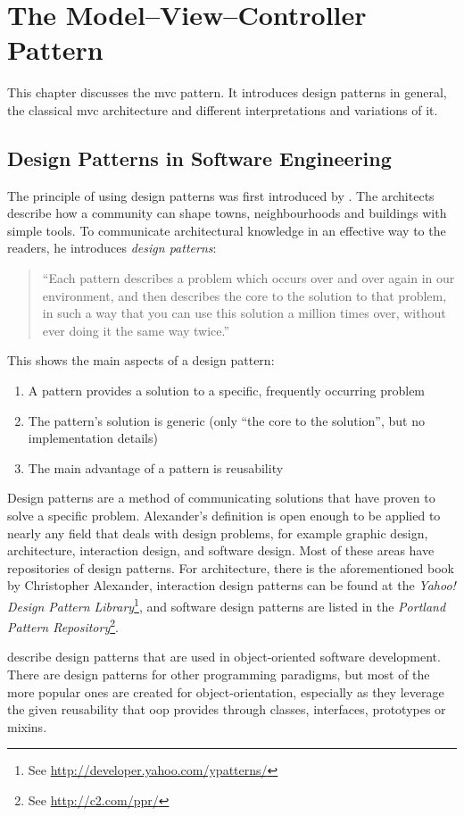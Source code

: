 \chapter{The Model--View--Controller Pattern}
\label{chap:mvc}
This chapter discusses the \acl{mvc} pattern. It introduces design patterns in general, the classical \acl{mvc} architecture and different interpretations and variations of it.
\section{Design Patterns in Software Engineering}
The principle of using design patterns was first introduced by . The architects describe how a community can shape towns, neighbourhoods and buildings with simple tools. To communicate architectural knowledge in an effective way to the readers, he introduces \emph{design patterns}:
\begin{quote}
	\enquote{Each pattern describes a problem which occurs over and over again in our environment, and then describes the core to the solution to that problem, in such a way that you can use this solution a million times over, without ever doing it the same way twice.} \cite[p. 10]{alexander}
\end{quote}
This shows the main aspects of a design pattern:
\begin{enumerate}
	\item A pattern provides a solution to a specific, frequently occurring problem
	\item The pattern's solution is generic (only ``the core to the solution'', but no implementation details)
	\item The main advantage of a pattern is reusability
\end{enumerate}
Design patterns are a method of communicating solutions that have proven to solve a specific problem. Alexander's definition is open enough to be applied to nearly any field that deals with design problems, for example graphic design, architecture, interaction design, and software design. Most of these areas have repositories of design patterns. For architecture, there is the aforementioned book by Christopher Alexander, interaction design patterns can be found at the \emph{Yahoo! Design Pattern Library}\footnote{See \url{http://developer.yahoo.com/ypatterns/}}, and software design patterns are listed in the \emph{Portland Pattern Repository}\footnote{See \url{http://c2.com/ppr/}}.

 describe design patterns that are used in object-oriented software development. There are design patterns for other programming paradigms, but most of the more popular ones are created for object-orientation, especially as they leverage the given reusability that \acs{oop} provides through classes, interfaces, \glspl{prototype} or \glspl{mixin}.

